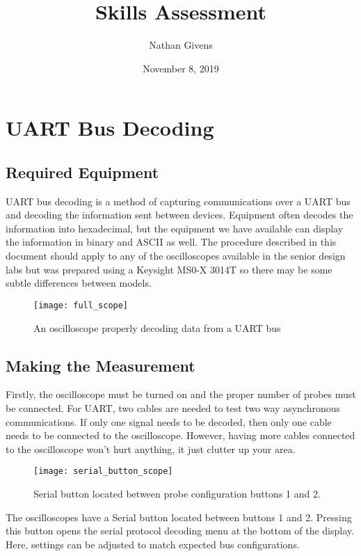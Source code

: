 \documentclass{article}
\title{Skills Assessment}
\author{Nathan Givens}
\date{November 8, 2019}
\begin{document}
  \maketitle

  \section{UART Bus Decoding}

  \subsection{Required Equipment}

  UART bus decoding is a method of capturing communications over a UART bus and
  decoding the information sent between devices. Equipment often decodes the
  information into hexadecimal, but the equipment we have available can display
  the information in binary and ASCII as well. The procedure described in this
  document should apply to any of the oscilloscopes available in the senior
  design labs but was prepared using a Keysight MS0-X 3014T so there may be
  some subtle differences between models.

  \begin{figure}[h]
    \texttt{[image: full\_scope]}
    \caption{An oscilloscope properly decoding data from a UART bus}
  \end{figure}

  \subsection{Making the Measurement}

  Firstly, the oscilloscope must be turned on and the proper number of probes
  must be connected. For UART, two cables are needed to test two way
  asynchronous communications. If only one signal needs to be decoded, then only
  one cable needs to be connected to the oscilloscope. However, having more
  cables connected to the oscilloscope won't hurt anything, it just clutter up
  your area.

  \begin{wrapfigure}{r}{0.4\textwidth}
    \texttt{[image: serial\_button\_scope]}
    \caption{Serial button located between probe configuration buttons 1 and 2.}
  \end{wrapfigure}

  The oscilloscopes have a Serial button located between buttons 1 and 2.
  Pressing this button opens the serial protocol decoding menu at the bottom of
  the display. Here, settings can be adjusted to match expected bus
  configurations.
\end{document}
